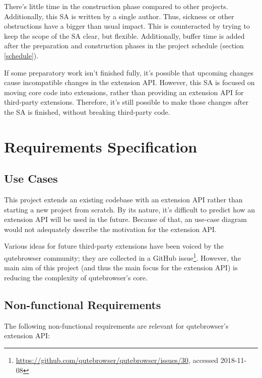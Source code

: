 \documentclass[a4paper,parskip=full,DIV=14,BCOR=15mm]{scrreprt}
\begin{document}
There's little time in the construction phase compared to other projects.
Additionally, this SA is written by a single author. Thus, sickness or other
obstructions have a bigger than usual impact. This is counteracted by trying to
keep the scope of the SA clear, but flexible. Additionally, buffer time is
added after the preparation and construction phases in the project schedule
(section \ref{schedule}).

If some preparatory work isn't finished fully, it's possible that upcoming
changes cause incompatible changes in the extension API. However, this SA
is focused on moving core code into extensions, rather than providing an
extension API for third-party extensions. Therefore, it's still possible to make
those changes after the SA is finished, without breaking third-party code.


\chapter{Requirements Specification}
\label{ch:requirements}

\section{Use Cases}

This project extends an existing codebase with an extension API rather
than starting a new project from scratch. By its nature, it's difficult to
predict how an extension API will be used in the future. Because of that, an
use-case diagram would not adequately describe the motivation for the extension
API.

Various ideas for future third-party extensions have been voiced by the
qutebrowser community; they are collected in a GitHub
issue\footnote{\url{https://github.com/qutebrowser/qutebrowser/issues/30},
  accessed 2018-11-08}. However, the main aim of this project (and thus the main
focus for the extension API) is reducing the complexity of qutebrowser's core.


\section{Non-functional Requirements}
The following non-functional requirements are relevant for qutebrowser's
extension API:
\end{document}

